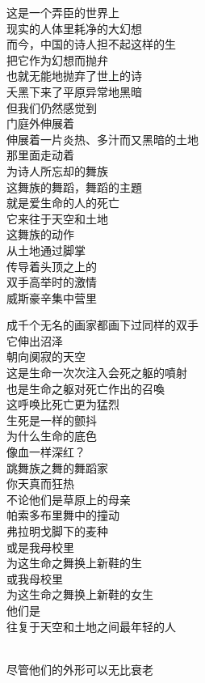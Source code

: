 \documentclass{article}
\begin{document}
这是一个弄臣的世界上\\
现实的人体里耗净的大幻想\\
而今，中国的诗人担不起这样的生\\
把它作为幻想而抛弁\\
也就无能地抛弃了世上的诗\\
夭黑下来了平原异常地黑暗\\
但我们仍然感觉到\\
门庭外伸展着\\
伸展着一片炎热、多汁而又黑暗的土地\\
那里面走动着
\\
为诗人所忘却的舞族 \\ 


这舞族的舞蹈，舞蹈的主題\\
就是爱生命的人的死亡\\
它来往于天空和土地\\
这舞族的动作\\
从土地通过脚掌\\
传导着头顶之上的\\
双手高举时的激情\\
威斯豪辛集中营里\\
\newpage

成千个无名的画家都画下过同样的双手\\
它伸出沼泽\\
朝向阒寂的天空\\
这是生命一次次注入会死之躯的噴射\\
也是生命之躯对死亡作出的召喚\\
这呼唤比死亡更为猛烈\\
生死是一样的颤抖\\
为什么生命的底色
\\
像血一样深红？ \\ 


跳舞族之舞的舞蹈家\\
你天真而狂热\\
不论他们是草原上的母亲\\
帕索多布里舞中的撞动\\
弗拉明戈脚下的麦种\\
或是我母校里\\
为这生命之舞换上新鞋的生\\
或我母校里\\
为这生命之舞换上新鞋的女生\\
他们是\\
往复于天空和土地之间最年轻的人
\newpage

\\
尽管他们的外形可以无比衰老 \\ 
\end{document}
